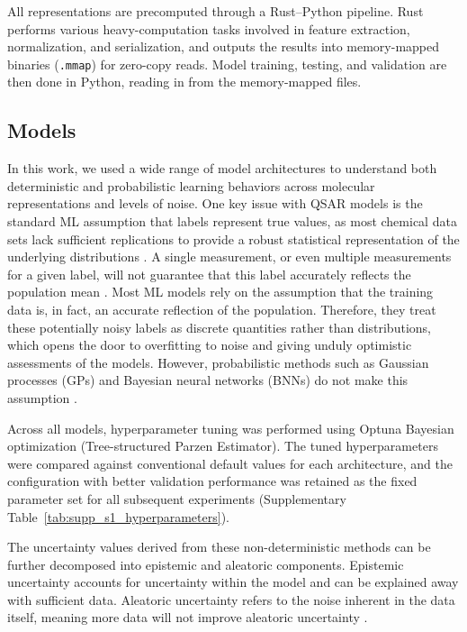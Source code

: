 \documentclass[pdflatex,sn-mathphys-num]{sn-jnl}%
\theoremstyle{thmstyleone}%
\theoremstyle{thmstyletwo}%
\theoremstyle{thmstylethree}%
\begin{document}
All representations are precomputed through a Rust–Python pipeline. Rust performs various heavy-computation tasks involved in feature extraction, normalization, and serialization, and outputs the results into memory-mapped binaries (\texttt{.mmap}) for zero-copy reads. Model training, testing, and validation are then done in Python, reading in from the memory-mapped files.

\subsection{Models}
In this work, we used a wide range of model architectures to understand both deterministic and probabilistic learning behaviors across molecular representations and levels of noise. One key issue with QSAR models is the standard ML assumption that labels represent true values, as most chemical data sets lack sufficient replications to provide a robust statistical representation of the underlying distributions \citep{Kolmar2021}. A single measurement, or even multiple measurements for a given label, will not guarantee that this label accurately reflects the population mean \citep{Kolmar2021}. Most ML models rely on the assumption that the training data is, in fact, an accurate reflection of the population. Therefore, they treat these potentially noisy labels as discrete quantities rather than distributions, which opens the door to overfitting to noise and giving unduly optimistic assessments of the models. However, probabilistic methods such as Gaussian processes (GPs) and Bayesian neural networks (BNNs) do not make this assumption \citep{Kolmar2021}.

Across all models, hyperparameter tuning was performed using Optuna \citep{akiba2019optuna} Bayesian optimization (Tree-structured Parzen Estimator). The tuned hyperparameters were compared against conventional default values for each architecture, and the configuration with better validation performance was retained as the fixed parameter set for all subsequent experiments (Supplementary Table~\ref{tab:supp_s1_hyperparameters}).

The uncertainty values derived from these non-deterministic methods can be further decomposed into epistemic and aleatoric components. Epistemic uncertainty accounts for uncertainty within the model and can be explained away with sufficient data. Aleatoric uncertainty refers to the noise inherent in the data itself, meaning more data will not improve aleatoric uncertainty \citep{Hllermeier2021, kendall2017}.
\end{document}
